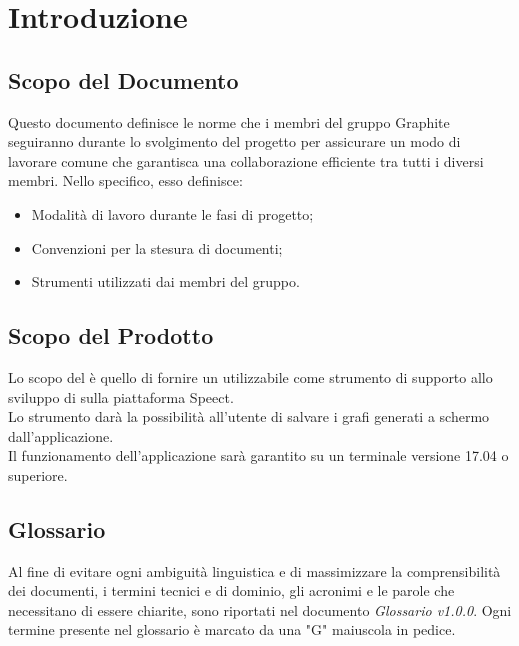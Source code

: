 \documentclass[./NormediProgetto.tex]{subfiles}
\begin{document}
	
\chapter{Introduzione}

\section{Scopo del Documento}

Questo documento definisce le norme che i membri del gruppo Graphite seguiranno durante lo svolgimento del progetto per assicurare un modo di lavorare comune
che garantisca una collaborazione efficiente tra tutti i diversi
membri. Nello specifico, esso definisce:

\begin{itemize}
	\item Modalità di lavoro durante le fasi di progetto;
	\item Convenzioni per la stesura di documenti;
	\item Strumenti utilizzati dai membri del gruppo.
\end{itemize}

\section{Scopo del Prodotto}

Lo scopo del  è quello di fornire un  utilizzabile come strumento di supporto allo sviluppo di  sulla piattaforma Speect. 
\\ \noindent Lo strumento darà la possibilità all'utente di salvare i grafi generati a schermo dall'applicazione.
\\ \noindent Il funzionamento dell'applicazione sarà garantito su un terminale  versione 17.04 o superiore.

\section{Glossario}

Al fine di evitare ogni ambiguità linguistica e di massimizzare la comprensibilità dei documenti, i termini tecnici e di dominio, gli acronimi e le parole che necessitano di essere chiarite, sono riportati nel documento \textit{Glossario v1.0.0}.
Ogni termine presente nel glossario è marcato da una "G" maiuscola in pedice.
\end{document}
